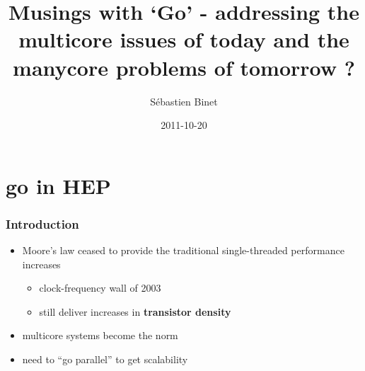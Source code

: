 \documentclass[bigger]{beamer}
\title{Musings with `Go' - addressing the multicore issues of today and the manycore problems of tomorrow ?}
\author{S\'ebastien Binet}
\date{2011-10-20}
\institute[LAL]{\insertlogo\hskip0.1cm}
\providecommand{\alert}[1]{\textbf{#1}}
\begin{document}
\maketitle





\section{go in HEP}
\label{sec-1}
\begin{frame}
\frametitle{Introduction}
\label{sec-1-1}


\begin{itemize}
\item Moore's law ceased to provide the traditional single-threaded
  performance increases
\begin{itemize}
\item clock-frequency wall of 2003
\item still deliver increases in \alert{transistor density}
\end{itemize}
\item multicore systems become the norm
\item need to ``go parallel'' to get scalability
\end{itemize}
\end{frame}
\end{document}
